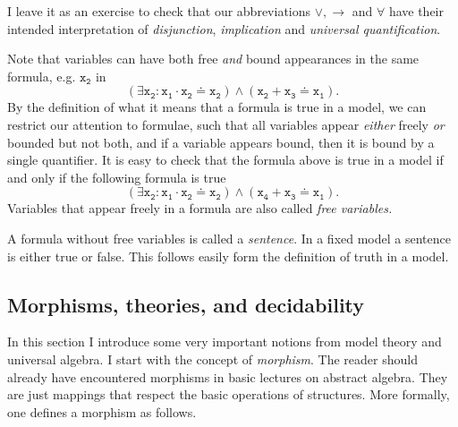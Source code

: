 \begin{rem}
  \begin{exlist}
    \item I leave it as an exercise to check that our abbreviations \(∨, →\)
    and \(∀\) have their intended interpretation of \emph{disjunction},
    \emph{implication} and \emph{universal quantification}.

    \item Note that variables can have both free \emph{and} bound appearances in
    the same formula, e.g. \(\mathtt{x_2}\) in
    \[
      \mathtt{(∃ x_2 : x_1 \cdot x_2 \doteq x_2) ∧ (x_2 + x_3 \doteq x_1)}.
    \]
    By the definition of what it means that a formula is true in a model, we can
    restrict our attention to formulae, such that all variables appear
    \emph{either} freely \emph{or} bounded but not both, and if a variable
    appears bound, then it is bound by a single quantifier. It is easy to check
    that the formula above is true in a model if and only if the following
    formula is true
    \[
      \mathtt{(∃ x_2 : x_1 \cdot x_2 \doteq x_2) ∧ (x_4 + x_3 \doteq x_1)}.
    \]
    Variables that appear freely in a formula are also called \emph{free
    variables.}
  \end{exlist}
\end{rem}

A formula without free variables is called a \emph{sentence}. In a fixed model a
sentence is either true or false. This follows easily form the definition of
truth in a model.

\subsection{Morphisms, theories, and decidability}


In this section I introduce some very important notions from model theory and
universal algebra. I start with the concept of \emph{morphism}. The reader
should already have encountered morphisms in basic lectures on abstract algebra.
They are just mappings that respect the basic operations of structures. More
formally, one defines a morphism as follows.

